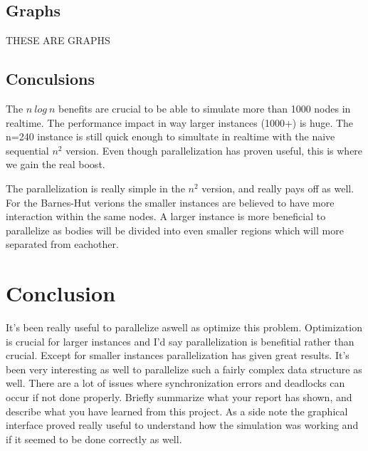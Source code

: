 \documentclass[a4paper] {article}
\begin{document}
\subsection{Graphs}

THESE ARE GRAPHS

\subsection{Conculsions}

The $n\ log\ n$ benefits are crucial to be able to simulate more than 1000 nodes in realtime. The performance impact in way larger instances (1000+) is huge. The n=240 instance is still quick enough to simultate in realtime with the naive sequential $n^2$ version. Even though parallelization has proven useful, this is where we gain the real boost.

The parallelization is really simple in the $n^2$ version, and really pays off as well. For the Barnes-Hut verions the smaller instances are believed to have more interaction within the same nodes. A larger instance is more beneficial to parallelize as bodies will be divided into even smaller regions which will more separated from eachother.

\section{Conclusion}

It's been really useful to parallelize aswell as optimize this problem. Optimization is crucial for larger instances and I'd say parallelization is benefitial rather than crucial. Except for smaller instances parallelization has given great results. It's been very interesting as well to parallelize such a fairly complex data structure as well. There are a lot of issues where synchronization errors and deadlocks can occur if not done properly.
Briefly summarize what your report has shown, and describe what you have learned from this project. As a side note the graphical interface proved really useful to understand how the simulation was working and if it seemed to be done correctly as well.
\end{document}
